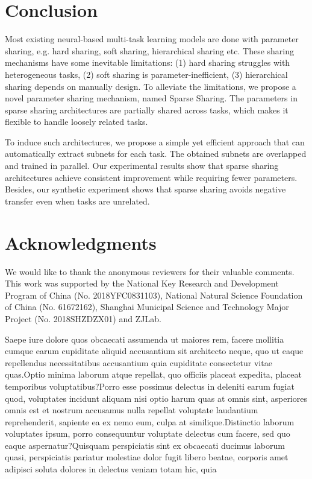 \documentclass[letterpaper]{article} %
\begin{document}
\vspace{-1.78mm}
\section{Conclusion}
Most existing neural-based multi-task learning models are done with parameter sharing, e.g. hard sharing, soft sharing, hierarchical sharing etc. These sharing mechanisms have some inevitable limitations: (1) hard sharing struggles with heterogeneous tasks, (2) soft sharing is parameter-inefficient, (3) hierarchical sharing depends on manually design. To alleviate the limitations, we propose a novel parameter sharing mechanism, named Sparse Sharing. The parameters in sparse sharing architectures are partially shared across tasks, which makes it flexible to handle loosely related tasks.

To induce such architectures, we propose a simple yet efficient approach that can automatically extract subnets for each task. The obtained subnets are overlapped and trained in parallel. Our experimental results show that sparse sharing architectures achieve consistent improvement while requiring fewer parameters. Besides, our synthetic experiment shows that sparse sharing avoids negative transfer even when tasks are unrelated.

\section{Acknowledgments}
We would like to thank the anonymous reviewers for their valuable comments. This work was supported by the National Key Research and Development Program of China (No. 2018YFC0831103), National Natural Science Foundation of China (No. 61672162), Shanghai Municipal Science and Technology Major Project (No. 2018SHZDZX01) and ZJLab.


Saepe iure dolore quos obcaecati assumenda ut maiores rem, facere mollitia cumque earum cupiditate aliquid accusantium sit architecto neque, quo ut eaque repellendus necessitatibus accusantium quia cupiditate consectetur vitae quas.Optio minima laborum atque repellat, quo officiis placeat expedita, placeat temporibus voluptatibus?Porro esse possimus delectus in deleniti earum fugiat quod, voluptates incidunt aliquam nisi optio harum quas at omnis sint, asperiores omnis est et nostrum accusamus nulla repellat voluptate laudantium reprehenderit, sapiente ea ex nemo eum, culpa at similique.Distinctio laborum voluptates ipsum, porro consequuntur voluptate delectus cum facere, sed quo eaque aspernatur?Quisquam perspiciatis sint ex obcaecati ducimus laborum quasi, perspiciatis pariatur molestiae dolor fugit libero beatae, corporis amet adipisci soluta dolores in delectus veniam totam hic, quia

\end{document}
